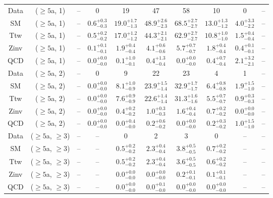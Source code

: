 \begin{table}[h!]
{\begin{tabular}{cccccccccc}
	Data & ($\ge5$a, 1) & -- & 0 & 19 & 47 & 58 & 10 & 0 & -- \\[0.5ex] 
	SM & ($\ge5$a, 1) & -- & $0.6^{+ 0.3 }_{- 0.3 }$ & $19.0^{+ 1.7 }_{- 1.3 }$ & $48.9^{+ 2.6 }_{- 2.3 }$ & $68.5^{+ 2.7 }_{- 2.7 }$ & $13.0^{+ 1.3 }_{- 1.2 }$ & $4.0^{+ 3.3 }_{- 2.2 }$ & -- \\[0.5ex] 
	Ttw & ($\ge5$a, 1) & -- & $0.5^{+ 0.2 }_{- 0.2 }$ & $17.0^{+ 1.2 }_{- 1.2 }$ & $44.3^{+ 2.1 }_{- 2.1 }$ & $62.9^{+ 2.7 }_{- 2.7 }$ & $10.8^{+ 1.0 }_{- 1.0 }$ & $1.5^{+ 0.4 }_{- 0.4 }$ & -- \\[0.5ex] 
	Zinv & ($\ge5$a, 1) & -- & $0.1^{+ 0.1 }_{- 0.1 }$ & $1.9^{+ 0.4 }_{- 0.4 }$ & $4.1^{+ 0.6 }_{- 0.6 }$ & $5.7^{+ 0.7 }_{- 0.7 }$ & $1.8^{+ 0.4 }_{- 0.4 }$ & $0.4^{+ 0.1 }_{- 0.1 }$ & -- \\[0.5ex] 
	QCD & ($\ge5$a, 1) & -- & $0.0^{+ 0.0 }_{- 0.0 }$ & $0.1^{+ 1.0 }_{- 0.1 }$ & $0.4^{+ 1.3 }_{- 0.4 }$ & $0.0^{+ 0.0 }_{- 0.0 }$ & $0.4^{+ 0.7 }_{- 0.4 }$ & $2.1^{+ 3.2 }_{- 2.1 }$ & -- \\[0.5ex] 
	Data & ($\ge5$a, 2) & -- & 0 & 9 & 22 & 23 & 4 & 1 & -- \\[0.5ex] 
	SM & ($\ge5$a, 2) & -- & $0.0^{+ 0.0 }_{- 0.0 }$ & $8.1^{+ 1.0 }_{- 0.9 }$ & $23.9^{+ 1.5 }_{- 1.4 }$ & $32.9^{+ 1.7 }_{- 1.7 }$ & $6.4^{+ 0.8 }_{- 0.8 }$ & $1.9^{+ 1.5 }_{- 1.0 }$ & -- \\[0.5ex] 
	Ttw & ($\ge5$a, 2) & -- & $0.0^{+ 0.0 }_{- 0.0 }$ & $7.6^{+ 0.9 }_{- 0.9 }$ & $22.6^{+ 1.4 }_{- 1.4 }$ & $31.3^{+ 1.6 }_{- 1.6 }$ & $5.5^{+ 0.7 }_{- 0.7 }$ & $0.9^{+ 0.3 }_{- 0.3 }$ & -- \\[0.5ex] 
	Zinv & ($\ge5$a, 2) & -- & $0.0^{+ 0.0 }_{- 0.0 }$ & $0.4^{+ 0.2 }_{- 0.2 }$ & $1.0^{+ 0.3 }_{- 0.3 }$ & $1.6^{+ 0.4 }_{- 0.4 }$ & $0.7^{+ 0.2 }_{- 0.2 }$ & $0.0^{+ 0.0 }_{- 0.0 }$ & -- \\[0.5ex] 
	QCD & ($\ge5$a, 2) & -- & $0.0^{+ 0.0 }_{- 0.0 }$ & $0.0^{+ 0.4 }_{- 0.0 }$ & $0.2^{+ 0.6 }_{- 0.2 }$ & $0.0^{+ 0.0 }_{- 0.0 }$ & $0.2^{+ 0.3 }_{- 0.2 }$ & $1.0^{+ 1.5 }_{- 1.0 }$ & -- \\[0.5ex] 
	Data & ($\ge5$a, $\ge3$) & -- & -- & 0 & 2 & 3 & 0 & -- & -- \\[0.5ex] 
	SM & ($\ge5$a, $\ge3$) & -- & -- & $0.5^{+ 0.2 }_{- 0.2 }$ & $2.3^{+ 0.4 }_{- 0.4 }$ & $3.8^{+ 0.5 }_{- 0.5 }$ & $0.7^{+ 0.2 }_{- 0.2 }$ & -- & -- \\[0.5ex] 
	Ttw & ($\ge5$a, $\ge3$) & -- & -- & $0.5^{+ 0.2 }_{- 0.2 }$ & $2.3^{+ 0.4 }_{- 0.4 }$ & $3.6^{+ 0.5 }_{- 0.5 }$ & $0.6^{+ 0.2 }_{- 0.2 }$ & -- & -- \\[0.5ex] 
	Zinv & ($\ge5$a, $\ge3$) & -- & -- & $0.0^{+ 0.0 }_{- 0.0 }$ & $0.0^{+ 0.0 }_{- 0.0 }$ & $0.2^{+ 0.1 }_{- 0.1 }$ & $0.1^{+ 0.1 }_{- 0.1 }$ & -- & -- \\[0.5ex] 
	QCD & ($\ge5$a, $\ge3$) & -- & -- & $0.0^{+ 0.0 }_{- 0.0 }$ & $0.0^{+ 0.1 }_{- 0.0 }$ & $0.0^{+ 0.0 }_{- 0.0 }$ & $0.0^{+ 0.0 }_{- 0.0 }$ & -- & -- \\[0.5ex] 
	\hline
	\hline
\end{tabular}}
\end{table}
